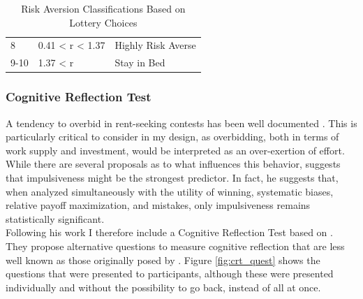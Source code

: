 \begin{table}[]
\begin{tabular}{lll}
    8                                                                 & 0.41 < r < 1.37                                                           & Highly Risk Averse                                                        \\
    9-10                                                              & 1.37 < r                                                                  & Stay in Bed\\
    \hline
    \end{tabular}
    \caption{Risk Aversion Classifications Based on Lottery Choices\\ \citep{holt2002}}
    \label{table:HL}
    \end{table}
    
    \subsubsection{Cognitive Reflection Test}
    \label{ss:CRT}
    
    A tendency to overbid in rent-seeking contests has been well documented \citep{sheremeta2013, dechenaux2015}. This is particularly critical to consider in my design, as overbidding, both in terms of work supply and investment, would be interpreted as an over-exertion of effort.\\
     
    While there are several proposals as to what influences this behavior, \cite{sheremeta2016} suggests that impulsiveness might be the strongest predictor. In fact, he suggests that, when analyzed simultaneously with the utility of winning, systematic biases, relative payoff maximization, and mistakes, only impulsiveness remains statistically significant.\\
    
    Following his work I therefore include a Cognitive Reflection Test based on \cite{thomson2016}. They propose alternative questions to measure cognitive reflection that are less well known as those originally posed by \cite{frederick2005}. Figure \ref{fig:crt_quest} shows the questions that were presented to participants, although these were presented individually and without the possibility to go back, instead of all at once.
    
